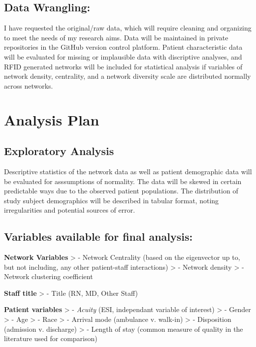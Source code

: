 \documentclass[]{elsarticle} %
\begin{document}
\subsection{Data Wrangling:}\label{data-wrangling}

I have requested the original/raw data, which will require cleaning and
organizing to meet the needs of my research aims. Data will be
maintained in private repositories in the GitHub version control
platform. Patient characteristic data will be evaluated for missing or
implausible data with discriptive analyses, and RFID generated networks
will be included for statistical analysis if variables of network
density, centrality, and a network diversity scale are distributed
normally across networks.

\section{Analysis Plan}\label{analysis-plan}

\subsection{Exploratory Analysis}\label{exploratory-analysis}

Descriptive statistics of the network data as well as patient
demographic data will be evaluated for asssumptions of normality. The
data will be skewed in certain predictable ways due to the observed
patient populations. The distribution of study subject demographics will
be described in tabular format, noting irregularities and potential
sources of error.

\subsection{Variables available for final
analysis:}\label{variables-available-for-final-analysis}

\textbf{Network Variables} \textgreater{} - Network Centrality (based on
the eigenvector up to, but not including, any other patient-staff
interactions) \textgreater{} - Network density \textgreater{} - Network
clustering coefficient

\textbf{Staff title} \textgreater{} - Title (RN, MD, Other Staff)

\textbf{Patient variables} \textgreater{} - \emph{Acuity} (ESI,
independant variable of interest) \textgreater{} - Gender \textgreater{}
- Age \textgreater{} - Race \textgreater{} - Arrival mode (ambulance v.
walk-in) \textgreater{} - Disposition (admission v. discharge)
\textgreater{} - Length of stay (common measure of quality in the
literature used for comparison)
\end{document}

